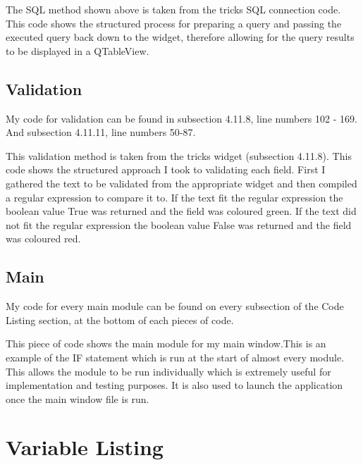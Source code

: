 
The SQL method shown above is taken from the tricks SQL connection code. This code shows the structured process for preparing a query and passing the executed query back down to the widget, therefore allowing for the query results to be displayed in a QTableView.

\subsection{Validation}

My code for validation can be found in subsection 4.11.8, line numbers 102 - 169. And subsection 4.11.11, line numbers 50-87.


This validation method is taken from the tricks widget (subsection 4.11.8). This code shows the structured approach I took to validating each field. First I gathered the text to be validated from the appropriate widget and then compiled a regular expression to compare it to. If the text fit the regular expression the boolean value True was returned and the field was coloured green. If the text did not fit the regular expression the boolean value False was returned and the field was coloured red.


\subsection{Main}

My code for every main module can be found on every subsection of the Code Listing section, at the bottom of each pieces of code.


This piece of code shows the main module for my main window.This is an example of the IF statement which is run at the start of almost every module. This allows the module to be run individually which is extremely useful for implementation and testing purposes. It is also used to launch the application once the main window file is run.









\section{Variable Listing}

